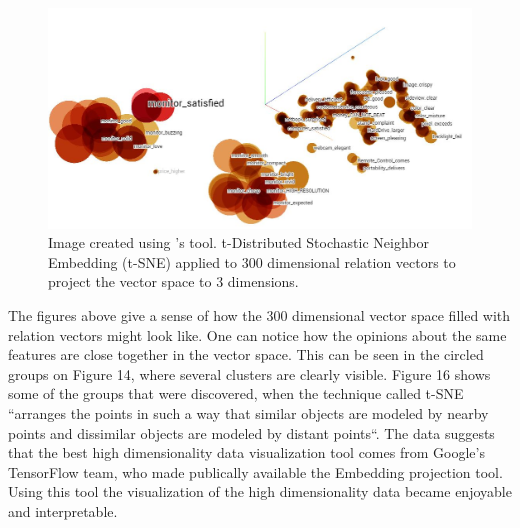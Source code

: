 \documentclass{sig-alternate}
\begin{document}
\begin{figure}
\centering
\includegraphics[scale=0.33]{images/tsne_new.JPG}
\caption{Image created using \cite{Smilkov2016}'s tool. t-Distributed Stochastic Neighbor Embedding (t-SNE) applied to 300 dimensional relation vectors to project the vector space to 3 dimensions.}
\end{figure}

The figures above give a sense of how the 300 dimensional vector space filled with relation vectors might look like. One can notice how the opinions about the same features are close together in the vector space. This can be seen in the circled groups on Figure 14, where several clusters are clearly visible. Figure 16 shows some of the groups that were discovered, when the technique called t-SNE ``arranges the points in such a way that similar objects are modeled by nearby points and dissimilar objects are modeled by distant points``\cite{maaten2008visualizing}. The data suggests that the best high dimensionality data visualization tool comes from Google's TensorFlow team, who made publically available the Embedding projection tool\cite{Smilkov2016}. Using this tool the visualization of the high dimensionality data became enjoyable and interpretable. 
\end{document}
